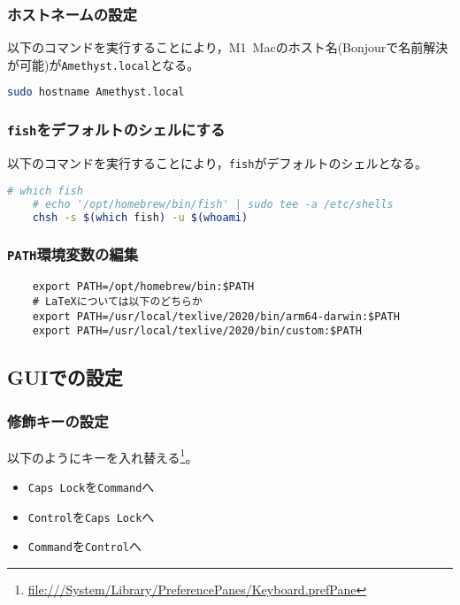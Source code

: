 \documentclass[b5j,titlepage]{ltjsarticle}
\begin{document}
			\subsubsection{ホストネームの設定}
				以下のコマンドを実行することにより，M1\ Macのホスト名(Bonjourで名前解決が可能)が\texttt{Amethyst.local}となる。

				\begin{lstlisting}[language=bash]
	sudo hostname Amethyst.local
				\end{lstlisting}

			\subsubsection{\texttt{fish}をデフォルトのシェルにする}
				以下のコマンドを実行することにより，\texttt{fish}がデフォルトのシェルとなる。

				\begin{lstlisting}[language=bash]
	# which fish
	# echo '/opt/homebrew/bin/fish' | sudo tee -a /etc/shells
	chsh -s $(which fish) -u $(whoami)
				\end{lstlisting}

			\subsubsection{\texttt{PATH}環境変数の編集}
				\begin{lstlisting}
	export PATH=/opt/homebrew/bin:$PATH
	# LaTeXについては以下のどちらか
	export PATH=/usr/local/texlive/2020/bin/arm64-darwin:$PATH
	export PATH=/usr/local/texlive/2020/bin/custom:$PATH
				\end{lstlisting}

		\subsection{GUIでの設定}
			\subsubsection{修飾キーの設定}
				以下のようにキーを入れ替える\footnote{\protect\url{file:///System/Library/PreferencePanes/Keyboard.prefPane}}。

				\begin{itemize}
					\item{\texttt{Caps\ Lock}を\texttt{Command}へ}
					\item{\texttt{Control}を\texttt{Caps\ Lock}へ}
					\item{\texttt{Command}を\texttt{Control}へ}
				\end{itemize}
\end{document}
